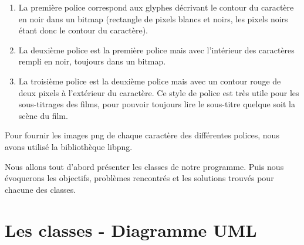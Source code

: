 \documentclass[a4paper, 12pt]{article}
\begin{document}
	\begin{enumerate}
		\item La première police correspond aux glyphes décrivant le contour du caractère en noir dans un bitmap (rectangle de pixels blancs et noirs, les pixels noirs étant donc le contour du caractère). 
		\item La deuxième police est la première police mais avec l’intérieur des caractères rempli en noir, toujours dans un bitmap. 
		\item La troisième police est la deuxième police mais avec un contour rouge de deux pixels à l’extérieur du caractère. Ce style de police est très utile pour les sous-titrages des films, pour pouvoir toujours lire le sous-titre quelque soit la scène du film. 
 	\end{enumerate}

	Pour fournir les images png de chaque caractère des différentes polices, nous avons utilisé la bibliothèque libpng.
\newline

Nous allons tout d’abord présenter les classes de notre programme. Puis nous évoquerons les objectifs, problèmes rencontrés et les solutions trouvés pour chacune des classes.
	
\newpage

\section{Les classes - Diagramme UML}			
\end{document}

